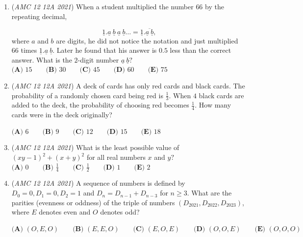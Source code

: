 \begin{enumerate}
 $\textbf{(A) }$ Purple snakes can add.


 $\textbf{(B) }$ Purple snakes are happy.


 $\textbf{(C) }$ Snakes that can add are purple.


 $\textbf{(D) }$ Happy snakes are not purple.


 $\textbf{(E) }$ Happy snakes can't subtract.


 

	\item (\textit{AMC 12 12A 2021}) When a student multiplied the number $66$ by the repeating decimal, 

 \[\underline{1}.\underline{a} \ \underline{b} \ \underline{a} \ \underline{b}\ldots=\underline{1}.\overline{\underline{a} \ \underline{b}},\] 
where $a$ and $b$ are digits, he did not notice the notation and just multiplied $66$ times $\underline{1}.\underline{a} \ \underline{b}.$ Later he found that his answer is $0.5$ less than the correct answer. What is the $2$-digit number $\underline{a} \ \underline{b}?$
$\textbf{(A) }15 \qquad \textbf{(B) }30 \qquad \textbf{(C) }45 \qquad \textbf{(D) }60 \qquad \textbf{(E) }75$


	\item (\textit{AMC 12 12A 2021}) A deck of cards has only red cards and black cards. The probability of a randomly chosen card being red is $\frac13$. When $4$ black cards are added to the deck, the probability of choosing red becomes $\frac14$. How many cards were in the deck originally?


 $\textbf{(A) }6 \qquad \textbf{(B) }9 \qquad \textbf{(C) }12 \qquad \textbf{(D) }15 \qquad \textbf{(E) }18$


	\item (\textit{AMC 12 12A 2021}) What is the least possible value of $(xy-1)^2+(x+y)^2$ for all real numbers $x$ and $y?$
$\textbf{(A) }0 \qquad \textbf{(B) }\frac14 \qquad \textbf{(C) }\frac12 \qquad \textbf{(D) }1 \qquad \textbf{(E) }2$


	\item (\textit{AMC 12 12A 2021}) A sequence of numbers is defined by $D_0=0,D_1=0,D_2=1$ and $D_n=D_{n-1}+D_{n-3}$ for $n\ge 3$. What are the parities (evenness or oddness) of the triple of numbers $(D_{2021},D_{2022},D_{2023})$, where $E$ denotes even and $O$ denotes odd?


 $\textbf{(A) }(O,E,O) \qquad \textbf{(B) }(E,E,O) \qquad \textbf{(C) }(E,O,E) \qquad \textbf{(D) }(O,O,E) \qquad \textbf{(E) }(O,O,O)$



\end{enumerate}
